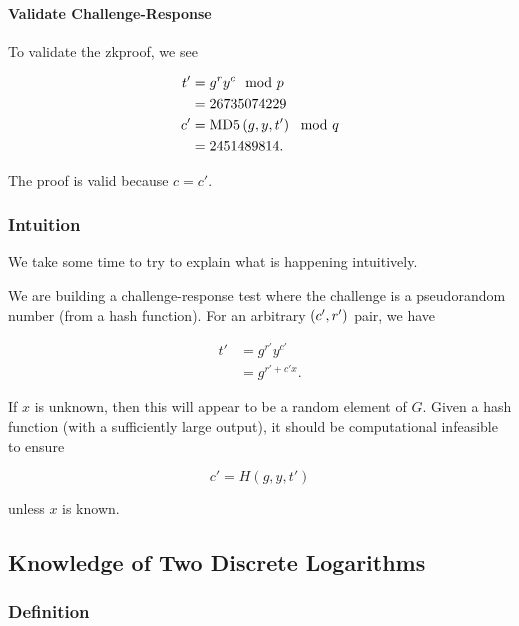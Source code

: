 \begin{example}
\paragraph{Validate Challenge-Response}
To validate the \gls{zkproof}, we see

\begin{align}
    t' &= g^{r}y^{c} \mod p \nonumber\\
        &= 26735074229 \nonumber\\
    c' &= \text{MD5{}}\left( g,y,t' \right) \mod q \nonumber\\
        &= 2451489814.
\end{align}

\noindent
The proof is valid because $c=c'$.


\end{example}

\subsubsection{Intuition}

We take some time to try to explain what is happening intuitively.

We are building a challenge-response test where the challenge
is a pseudorandom number (from a \gls{hash function}).
For an arbitrary $\left( c',r' \right)$ pair, we have

\begin{align}
    t' &= g^{r'}y^{c'} \nonumber\\
        &= g^{r'+c'x}.
\end{align}

\noindent
If $x$ is unknown, then this will appear to be a random element of $G$.
Given a \gls{hash function} (with a sufficiently large output),
it should be computational infeasible to ensure

\begin{equation}
    c' = H(g,y,t')
\end{equation}

\noindent
unless $x$ is known.


\subsection{Knowledge of Two Discrete Logarithms}
\label{sec:zkproofs_2_dlog}

\subsubsection{Definition}

